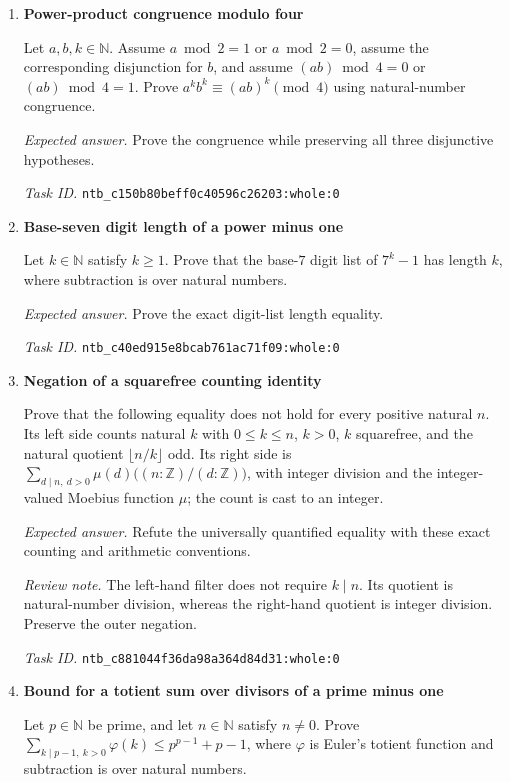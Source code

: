 \documentclass[11pt]{article}
\newcommand{\pth}[1]{\nolinkurl{#1}}
\begin{document}
\begin{enumerate}[label={TEST \arabic*.},leftmargin=4.5em,itemsep=1em]
\item \textbf{Power-product congruence modulo four}\label{qn:test:68}

Let $a,b,k\in\mathbb N$. Assume $a\bmod2=1$ or $a\bmod2=0$, assume the corresponding disjunction for $b$, and assume $(ab)\bmod4=0$ or $(ab)\bmod4=1$. Prove $a^k b^k\equiv(ab)^k\pmod4$ using natural-number congruence.

\emph{Expected answer.} Prove the congruence while preserving all three disjunctive hypotheses.

\emph{Task ID.} \pth{ntb_c150b80beff0c40596c26203:whole:0}

\item \textbf{Base-seven digit length of a power minus one}\label{qn:test:69}

Let $k\in\mathbb N$ satisfy $k\ge1$. Prove that the base-$7$ digit list of $7^k-1$ has length $k$, where subtraction is over natural numbers.

\emph{Expected answer.} Prove the exact digit-list length equality.

\emph{Task ID.} \pth{ntb_c40ed915e8bcab761ac71f09:whole:0}

\item \textbf{Negation of a squarefree counting identity}\label{qn:test:70}

Prove that the following equality does not hold for every positive natural $n$. Its left side counts natural $k$ with $0\le k\le n$, $k>0$, $k$ squarefree, and the natural quotient $\lfloor n/k\rfloor$ odd. Its right side is $\sum_{d\mid n,\ d>0}\mu(d)\bigl((n:\mathbb Z)/(d:\mathbb Z)\bigr)$, with integer division and the integer-valued Moebius function $\mu$; the count is cast to an integer.

\emph{Expected answer.} Refute the universally quantified equality with these exact counting and arithmetic conventions.

\emph{Review note.} The left-hand filter does not require $k\mid n$. Its quotient is natural-number division, whereas the right-hand quotient is integer division. Preserve the outer negation.

\emph{Task ID.} \pth{ntb_c881044f36da98a364d84d31:whole:0}

\item \textbf{Bound for a totient sum over divisors of a prime minus one}\label{qn:test:71}

Let $p\in\mathbb N$ be prime, and let $n\in\mathbb N$ satisfy $n\ne0$. Prove $\sum_{k\mid p-1,\ k>0}\varphi(k)\le p^{p-1}+p-1$, where $\varphi$ is Euler's totient function and subtraction is over natural numbers.


\end{enumerate}
\end{document}
